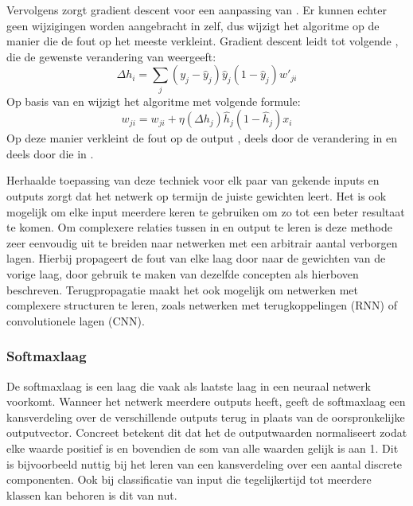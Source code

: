 Vervolgens zorgt gradient descent voor een aanpassing van . Er kunnen echter geen wijzigingen worden aangebracht in  zelf, dus wijzigt het algoritme  op de manier die de fout op  het meeste verkleint. Gradient descent leidt tot volgende , die de gewenste verandering van  weergeeft:
\begin{equation}
    \Delta h_i = \sum\limits_{j}(y_j-\hat{y}_j)\hat{y}_j(1-\hat{y}_j)w'_{ji}
\end{equation}
Op basis van  en  wijzigt het algoritme  met volgende formule:
\begin{equation}
    w_{ji} = w_{ji} + \eta(\Delta h_j)\hat{h}_j(1-\hat{h}_j)x_i
\end{equation}
Op deze manier verkleint de fout op de output , deels door de verandering in  en deels door die in \cite{Blockeel}.

Herhaalde toepassing van deze techniek voor elk paar van gekende inputs en outputs zorgt dat het netwerk op termijn de juiste gewichten leert. Het is ook mogelijk om elke input meerdere keren te gebruiken om zo tot een beter resultaat te komen. Om complexere relaties tussen in en output te leren is deze methode zeer eenvoudig uit te breiden naar netwerken met een arbitrair aantal verborgen lagen. Hierbij propageert de fout van elke laag door naar de gewichten van de vorige laag, door gebruik te maken van dezelfde concepten als hierboven beschreven. Terugpropagatie maakt het ook mogelijk om netwerken met complexere structuren te leren, zoals netwerken met terugkoppelingen (RNN) of convolutionele lagen (CNN).

\subsubsection{Softmaxlaag}\label{par:softmax}
De softmaxlaag is een laag die vaak als laatste laag in een neuraal netwerk voorkomt. Wanneer het netwerk meerdere outputs heeft, geeft de softmaxlaag een kansverdeling over de verschillende outputs terug in plaats van de oorspronkelijke outputvector. Concreet betekent dit dat het de outputwaarden normaliseert zodat elke waarde positief is en bovendien de som van alle waarden gelijk is aan 1. Dit is bijvoorbeeld nuttig bij het leren van een kansverdeling over een aantal discrete componenten. Ook bij classificatie van input die tegelijkertijd tot meerdere klassen kan behoren is dit van nut.

